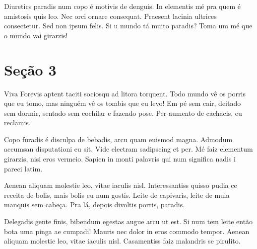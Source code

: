 \documentclass{article}
\begin{document}
	Diuretics paradis num copo é motivis de denguis. In elementis mé pra quem é amistosis quis leo. Nec orci ornare consequat. Praesent lacinia ultrices consectetur. Sed non ipsum felis. Si u mundo tá muito paradis? Toma um mé que o mundo vai girarzis!
	
	\section{Seção 3}
	
	Viva Forevis aptent taciti sociosqu ad litora torquent. Todo mundo vê os porris que eu tomo, mas ninguém vê os tombis que eu levo! Em pé sem cair, deitado sem dormir, sentado sem cochilar e fazendo pose. Per aumento de cachacis, eu reclamis.  
	
	Copo furadis é disculpa de bebadis, arcu quam euismod magna. Admodum accumsan disputationi eu sit. Vide electram sadipscing et per. Mé faiz elementum girarzis, nisi eros vermeio. Sapien in monti palavris qui num significa nadis i pareci latim.
	
	Aenean aliquam molestie leo, vitae iaculis nisl. Interessantiss quisso pudia ce receita de bolis, mais bolis eu num gostis. Leite de capivaris, leite de mula manquis sem cabeça. Pra lá, depois divoltis porris, paradis.
	
	Delegadis gente finis, bibendum egestas augue arcu ut est. Si num tem leite então bota uma pinga ae cumpadi! Mauris nec dolor in eros commodo tempor. Aenean aliquam molestie leo, vitae iaculis nisl. Casamentiss faiz malandris se pirulito.
	
\end{document}
